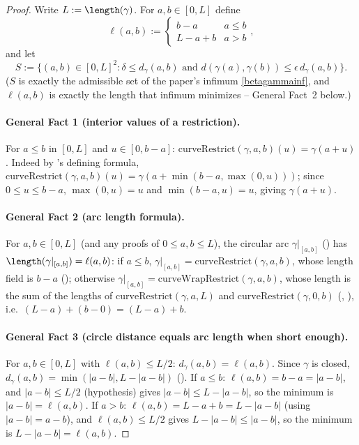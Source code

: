 \begin{proof}
  Write $L := \length(\gamma)$. For $a,b \in [0,L]$ define
  \[
    \ell(a,b) := \begin{cases} b - a & a \le b \\ L - a + b & a > b\end{cases}
    ,
  \]
  and let
  \[
    S := \{(a,b) \in [0,L]^2 : \delta \le d_\gamma(a,b) \text{ and } d(\gamma(a),\gamma(b)) \le
    \epsilon\, d_\gamma(a,b)\}
    .
  \]
  ($S$ is exactly the admissible set of the paper's infimum \eqref{betagammainf}, and $\ell(a,b)$ is
  exactly the length that infimum minimizes -- General Fact~2 below.)

  \paragraph{General Fact 1 (interior values of a restriction).} For $a\le b$ in $[0,L]$ and $u \in
  [0,b-a]$: $\mathrm{curveRestrict}(\gamma,a,b)(u) = \gamma(a+u)$. Indeed by
  's defining formula, $\mathrm{curveRestrict}(\gamma,a,b)(u) = \gamma(a +
  \min(b-a,\max(0,u)))$; since $0\le u\le b-a$, $\max(0,u)=u$ and $\min(b-a,u)=u$, giving
  $\gamma(a+u)$.

  \paragraph{General Fact 2 (arc length formula).} For $a,b\in[0,L]$ (and any proofs of $0\le a,b
  \le L$), the circular arc $\gamma|_{[a,b]}$ () has $\length(\gamma|_{[a,b]}) =
  \ell(a,b)$: if $a\le b$, $\gamma|_{[a,b]} = \mathrm{curveRestrict}(\gamma,a,b)$, whose length field
  is $b-a$ (); otherwise $\gamma|_{[a,b]} =
  \mathrm{curveWrapRestrict}(\gamma,a,b)$, whose length is the sum of the lengths of
  $\mathrm{curveRestrict}(\gamma,a,L)$ and $\mathrm{curveRestrict}(\gamma,0,b)$
  (, ), i.e.\ $(L-a)+(b-0) = (L-a)+b$.

  \paragraph{General Fact 3 (circle distance equals arc length when short enough).} For $a,b\in
  [0,L]$ with $\ell(a,b) \le L/2$: $d_\gamma(a,b) = \ell(a,b)$. Since $\gamma$ is closed,
  $d_\gamma(a,b) = \min(|a-b|, L-|a-b|)$ (). If $a\le b$: $\ell(a,b)=b-a=|a-b|$, and
  $|a-b|\le L/2$ (hypothesis) gives $|a-b| \le L - |a-b|$, so the minimum is $|a-b|=\ell(a,b)$. If
  $a>b$: $\ell(a,b) = L-a+b = L-|a-b|$ (using $|a-b|=a-b$), and $\ell(a,b)\le L/2$ gives
  $L-|a-b|\le|a-b|$, so the minimum is $L-|a-b|=\ell(a,b)$.


\end{proof}
